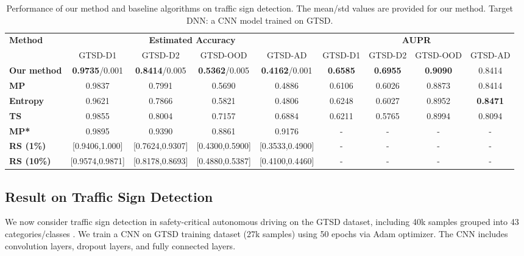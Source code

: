 \documentclass{article}
\begin{document}
\begin{table*}[!t]
	\centering
	\caption{Performance of our method and baseline algorithms on traffic sign detection. The mean/std values are provided for our method. Target DNN: a CNN model trained on GTSD.}
	\setlength{\tabcolsep}{3.5pt}
	\vspace{-0.2cm}
	\small
	\begin{tabular}{l|cccc|cccc}
		\hline
		\multirow{2}{*}{\textbf{Method}} & \multicolumn{4}{c|}{\textbf{Estimated Accuracy}} & \multicolumn{4}{c}{\textbf{AUPR}} \\
		\cline{2-9}      & GTSD-D1 & GTSD-D2 & GTSD-OOD & GTSD-AD & GTSD-D1 & GTSD-D2 & GTSD-OOD & GTSD-AD \\
		\hline
		\multicolumn{1}{p{5.5em}|}{\textbf{Our method}} & \textbf{0.9735}/0.001 & \textbf{0.8414}/0.005 & \textbf{0.5362}/0.005 & \textbf{0.4162}/0.001 & \textbf{0.6585} & \textbf{0.6955} & \textbf{0.9090} & 0.8414 \\
		\multicolumn{1}{p{5.5em}|}{\textbf{MP}} & 0.9837 & 0.7991 & 0.5690 & 0.4886 & 0.6106 & 0.6026 & 0.8873 & 0.8414 \\
		\multicolumn{1}{p{5.5em}|}{\textbf{Entropy}} & 0.9621 & 0.7866 & 0.5821 & 0.4806 & 0.6248 & 0.6027 & 0.8952 & \textbf{0.8471} \\
		\textbf{TS} & 0.9855 & 0.8004 & 0.7157 & 0.6884 & 0.6211 & 0.5765 & 0.8994 & 0.8094 \\
		\multicolumn{1}{p{5.5em}|}{\textbf{MP*}} & 0.9895 & 0.9390 & 0.8861 & 0.9176 & -     & -     & -     & - \\
		\textbf{RS (1\%)} & [0.9406,1.000] & [0.7624,0.9307] & [0.4300,0.5900] & [0.3533,0.4900] & -     & -     & -     & - \\
		\textbf{RS (10\%)} & [0.9574,0.9871] & [0.8178,0.8693] & [0.4880,0.5387] & [0.4100,0.4460] & -     & -     & -     & - \\
		\hline
	\end{tabular}
	\label{tab:GTSDclass_accuracy}
	\vspace{-0.3cm}
\end{table*}


\subsection{Result on Traffic Sign Detection}
We now consider traffic sign detection in safety-critical autonomous driving on the GTSD dataset, including 40k samples grouped into 43 categories/classes \cite{traffic_sign_dataset_IJCNN_2013}. We train a CNN on GTSD training dataset (27k samples) using 50 epochs via Adam optimizer. The CNN includes convolution layers, dropout layers, and fully connected layers.
\end{document}
